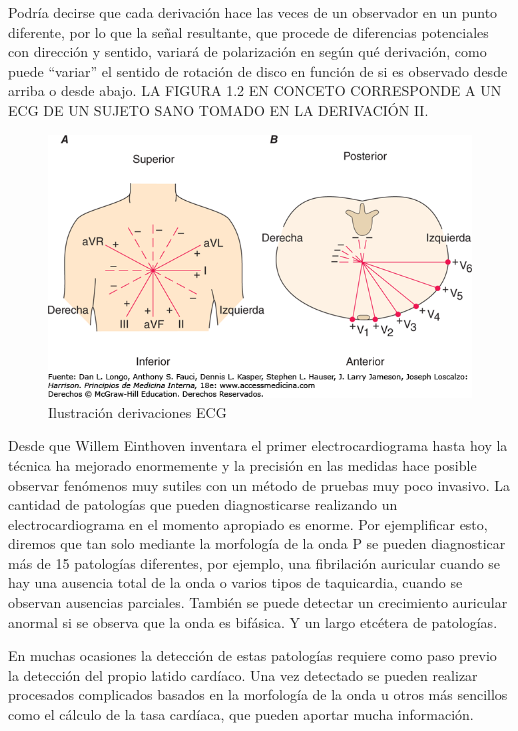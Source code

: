 Podría decirse que cada derivación hace las veces de un observador en un punto diferente, por lo que la señal resultante, que procede de diferencias potenciales con dirección y sentido, variará de polarización en según qué derivación, como puede “variar” el sentido de rotación de disco en función de si es observado desde arriba o desde abajo. LA FIGURA 1.2 EN CONCETO CORRESPONDE A UN ECG DE UN SUJETO SANO TOMADO EN LA DERIVACIÓN II.

\begin{figure}[ht]
	\centering
		\includegraphics[width=0.9\linewidth]{figuras/derivations.png}
	\caption{Ilustración derivaciones ECG}
	\label{fig:derivaciones}
\end{figure} 

Desde que Willem Einthoven inventara el primer electrocardiograma hasta hoy la técnica ha mejorado enormemente y la precisión en las medidas hace posible observar fenómenos muy sutiles con un método de pruebas muy poco invasivo. La cantidad de patologías que pueden diagnosticarse realizando un electrocardiograma en el momento apropiado es enorme. \cite{PatologiasECG} Por ejemplificar esto, diremos que tan solo mediante la morfología de la onda P se pueden diagnosticar más de 15 patologías diferentes, por ejemplo, una fibrilación auricular cuando se hay una ausencia total de la onda o varios tipos de taquicardia, cuando se observan ausencias parciales. También se puede detectar un crecimiento auricular anormal si se observa que la onda es bifásica. Y un largo etcétera de patologías.

En muchas ocasiones la detección de estas patologías requiere como paso previo la detección del propio latido cardíaco. Una vez detectado se pueden realizar procesados complicados basados en la morfología de la onda u otros más sencillos como el cálculo de la tasa cardíaca, que pueden aportar mucha información.

